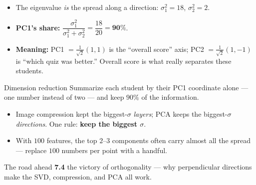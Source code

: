 \documentclass[aspectratio=169, 11pt]{beamer}
\begin{document}
\begin{frame}[t, plain]
  \begin{itemize}
    \setlength{\itemsep}{6pt}
    \item The eigenvalue \emph{is} the spread along a direction: $\sigma_1^2=18$, $\sigma_2^2=2$.
    \item \textbf{PC1's share:} $\dfrac{\sigma_1^2}{\sigma_1^2+\sigma_2^2}=\dfrac{18}{20}=\mathbf{90\%}$.
    \item \textbf{Meaning:} PC1 $=\tfrac1{\sqrt2}(1,1)$ is the ``overall score'' axis; PC2 $=\tfrac1{\sqrt2}(1,-1)$
          is ``which quiz was better.'' Overall score is what really separates these students.
  \end{itemize}
  \vspace{2pt}
  \begin{block}{Dimension reduction}
    Summarize each student by their PC1 coordinate alone --- one number instead of two --- and keep $90\%$ of
    the information.
  \end{block}
\end{frame}

\begin{frame}[t, plain]
  \begin{itemize}
    \setlength{\itemsep}{6pt}
    \item Image compression kept the biggest-$\sigma$ \emph{layers}; PCA keeps the biggest-$\sigma$
          \emph{directions}. One rule: \textbf{keep the biggest $\sigma$}.
    \item With $100$ features, the top $2$--$3$ components often carry almost all the spread --- replace $100$
          numbers per point with a handful.
  \end{itemize}
  \vspace{2pt}
  \begin{block}{The road ahead}
    \textbf{7.4} the victory of orthogonality --- why perpendicular directions make the SVD, compression, and
    PCA all work.
  \end{block}
\end{frame}
\end{document}
